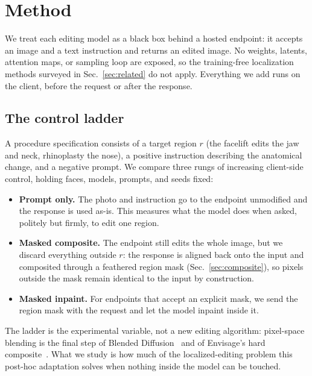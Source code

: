 \section{Method}
\label{sec:method}

We treat each editing model as a black box behind a hosted endpoint: it accepts an
image and a text instruction and returns an edited image. No weights, latents,
attention maps, or sampling loop are exposed, so the training-free localization
methods surveyed in Sec.~\ref{sec:related} do not apply. Everything we add runs on
the client, before the request or after the response.

\subsection{The control ladder}
\label{sec:ladder}

A procedure specification consists of a target region $r$ (the facelift edits the
jaw and neck, rhinoplasty the nose), a positive
instruction describing the anatomical change, and a negative prompt. We compare
three rungs of increasing client-side control, holding faces, models, prompts, and
seeds fixed:

\begin{itemize}
  \item \textbf{Prompt only.} The photo and instruction go to the endpoint
  unmodified and the response is used as-is. This measures what the model does when
  asked, politely but firmly, to edit one region.
  \item \textbf{Masked composite.} The endpoint still edits the whole image, but we
  discard everything outside $r$: the response is aligned back onto the input and
  composited through a feathered region mask (Sec.~\ref{sec:composite}), so pixels
  outside the mask remain identical to the input by construction.
  \item \textbf{Masked inpaint.} For endpoints that accept an explicit mask, we send
  the region mask with the request and let the model inpaint inside it.
\end{itemize}

The ladder is the experimental variable, not a new editing algorithm: pixel-space
blending is the final step of Blended Diffusion~\cite{avrahami2022blended} and of
Envisage's hard composite~\cite{agarwal2026envisage}. What we study is how much of
the localized-editing problem this post-hoc adaptation solves when nothing inside
the model can be touched.

